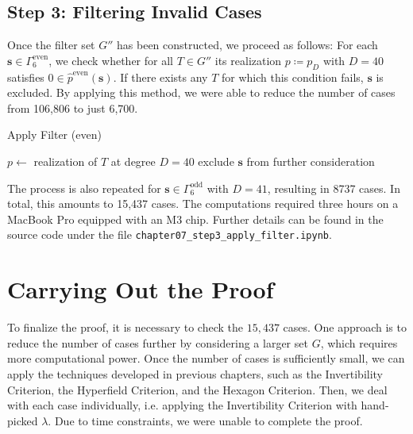 \subsection*{Step 3: Filtering Invalid Cases}

Once the filter set \( G'' \) has been constructed, we proceed as follows: For each \( \mathbf{s} \in \Gamma^{\mathrm{even}}_6 \), we check whether for all \( T \in G'' \) its realization \( p \coloneqq p_D \) with \( D = 40 \) satisfies \( 0 \in \hat p^{\mathrm{even}}(\mathbf{s}) \). If there exists any \( T \) for which this condition fails, \( \mathbf{s} \) is excluded. By applying this method, we were able to reduce the number of cases from 106,806 to just 6,700. 
\begin{algorithm}[H]
    \caption{Apply Filter (even)}
    \label{alg:filter}
    \begin{algorithmic}[1]
        \State \( p \gets \) realization of \( T \) at degree \( D = 40 \)
            \State exclude \( \mathbf{s} \) from further consideration
        \EndIf        
        \EndFor       
    \EndFor
\EndFunction
\end{algorithmic}
\end{algorithm}
The process is also repeated for \( \mathbf{s} \in \Gamma^{\mathrm{odd}}_6 \) with \( D = 41 \), resulting in 8737 cases. 
In total, this amounts to 15,437 cases. 
The computations required three hours on a MacBook Pro equipped with an M3 chip. Further details can be found in the source code \cite{ducrepo} under the file \texttt{chapter07\_step3\_apply\_filter.ipynb}.


\section{Carrying Out the Proof}

To finalize the proof, it is necessary to check the \( 15,437 \) cases. 
One approach is to reduce the number of cases further by considering a larger set \( G \), 
which requires more computational power. 
Once the number of cases is sufficiently small, we can apply the techniques developed in previous chapters, 
such as the Invertibility Criterion, the Hyperfield Criterion, and the Hexagon Criterion. Then, we deal with each case individually, i.e. applying the Invertibility Criterion with hand-picked \( \lambda \). Due to time constraints, we were unable to complete the proof. 